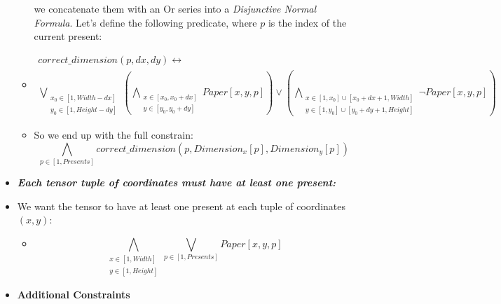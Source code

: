 \begin{itemize}
\begin{itemize}
                we concatenate them with an Or series into a \textit{Disjunctive Normal Formula}.
                Let's define the following predicate, where $p$ is the index of the current present:
        \item[] \begin{equation*}\begin{multlined}
            correct\_dimension(p, dx, dy) \leftrightarrow \\
            \bigvee_{
                \substack{
                    x_0 \in [1, Width - dx]\\
                    y_0 \in [1, Height - dy]
                }
            }
            (\bigwedge_{
                \substack{
                    x \in [x_0, x_0 + dx] \\
                    y \in [y_0, y_0 + dy]
                }
             } Paper[x, y, p])
             \vee
            (\bigwedge_{
                \substack{
                    x \in [1, x_0] \cup [x_0 + dx + 1, Width]\\
                    y \in [1, y_0] \cup [y_0 + dy + 1, Height]
                }
             } \neg Paper[x, y, p]) 
        \end{multlined}\end{equation*}
        \item[] So we end up with the full constrain:\\
        \begin{equation*} \bigwedge_{p \in [1, Presents]} correct\_dimension(p, Dimension_x[p], Dimension_y[p]) \end{equation*}  
    \end{itemize}
    \item \textbf{\textit{Each tensor tuple of coordinates must have at least one present:}}
    \item[] We want the tensor to have at least one present at each tuple of coordinates $(x, y)$:
    \begin{itemize}
        \item[] \begin{equation*}
            \bigwedge_{
                \substack{
                    x \in [1, Width]\\
                    y \in [1, Height]
                }
            } \bigvee_{p \in [1, Presents]} Paper[x, y, p]
        \end{equation*}
    \end{itemize} 
    \item[] \textbf{Additional Constraints}

\end{itemize}
